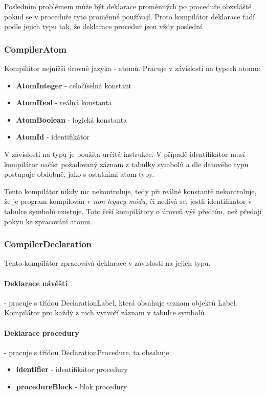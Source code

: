 \documentclass[
12pt,
a4paper,
pdftex,
czech,
titlepage
]{report}
\begin{document}
Posledním problémem může být deklarace proměnných po proceduře obzvláště pokud se v proceduře tyto proměnné používají. Proto kompilátor deklarace řadí podle jejich typu tak, že deklarace procedur jsou vždy poslední.

\subsubsection{CompilerAtom}
Kompilátor nejnižší úrovně jazyka - atomů. Pracuje v závislosti na typech atomu:
\begin{itemize}
\item \textbf{AtomInteger} - celočíselná konstant
\item \textbf{AtomReal} - reálná konstanta
\item \textbf{AtomBoolean} - logická konstanta
\item \textbf{AtomId} - identifikátor
\end{itemize}

V závislosti na typu je použita určitá instrukce. V případě identifikátor musí kompilátor načíst požadovaný záznam z tabulky symbolů a dle datového typu postupuje obdobně, jako s ostatními atom typy.

Tento kompilátor nikdy nic nekontroluje, tedy při reálné konstantě nekontroluje, že je program kompilován v \textit{non-legacy módu}, či nedívá se, jestli identifikátor v tabulce symbolů existuje. Toto řeší kompilátory o úroveň výš předtím, než předají pokyn ke zpracování atomu.

\subsubsection{CompilerDeclaration}

Tento kompilátor zpracovává deklarace v závislosti na jejich typu.

\paragraph{Deklarace návěští} - pracuje s třídou DeclarationLabel, která obsahuje seznam objektů Label. Kompilátor pro každý z nich vytvoří záznam v tabulce symbolů

\paragraph{Deklarace procedury} - pracuje s třídou DeclarationProcedure, ta obsahuje:
\begin{itemize}
\item \textbf{identifier} - identifikátor procedury
\item \textbf{procedureBlock} - blok procedury
\end{itemize}
\end{document}
